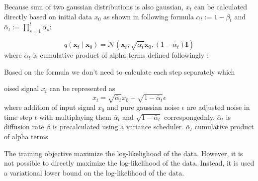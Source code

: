 

Because sum of two gaussian distributions is also gaussian, $x_t$ can be calculated directly based on initial data $x_0$ as shown in following formula $\alpha_{t}:=1-\beta_{t}$ and $\bar{\alpha}_{t}:=\prod_{s=1}^{t} \alpha_{s}$:

\begin{equation}
q\left(\mathbf{x}_{t} \mid \mathbf{x}_{0}\right)=\mathcal{N}\left(\mathbf{x}_{t} ; \sqrt{\bar{\alpha}_{t}} \mathbf{x}_{0},\left(1-\bar{\alpha}_{t}\right) \mathbf{I}\right) 
\end{equation}
 where $\bar{\alpha}_{t}$ is cumulative product of alpha terms defined followingly :



Based on the formula we don't need to calculate each step separately which


oised signal $x_t$ can be represented as
\begin{equation}
    x_{t} =\sqrt{\bar{\alpha}_{t}} x_{0}+\sqrt{1-\bar{\alpha}_{t}} \epsilon \tag{3}
\end{equation}
where addition of input signal $x_0$ and pure gaussian noise $\epsilon$ are adjusted noise in time step $t$ with multiplaying them $\bar{\alpha}_{t}$ and $\sqrt{1-\bar{\alpha}_{t}}$ correspongednly. $\bar{\alpha}_{t}$ is diffusion rate $\beta$ is precalculated using a variance scheduler.
$\bar{\alpha}_{t}$ cumulative product of alpha terms


The training objective maximize the log-likelighood of the data. However, it is not possible to directly maximize the log-likelihood of the data. Instead, it is used a variational lower bound on the log-likelihood of the data. 

